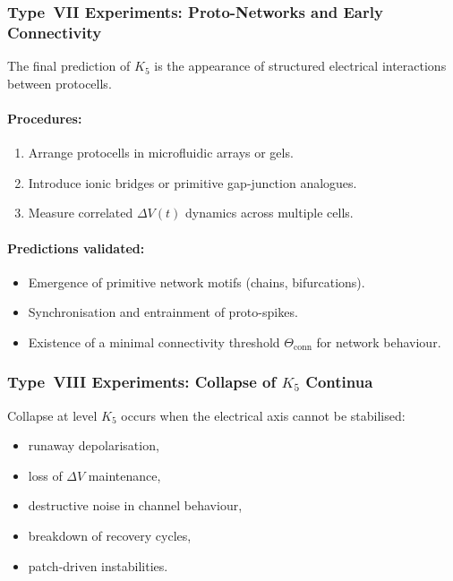 \subsubsection{Type~VII Experiments: Proto-Networks and Early Connectivity}

The final prediction of $K_5$ is the appearance of structured 
electrical interactions between protocells.

\paragraph{Procedures:}

\begin{enumerate}
    \item Arrange protocells in microfluidic arrays or gels.
    \item Introduce ionic bridges or primitive gap-junction analogues.
    \item Measure correlated $\Delta V(t)$ dynamics across multiple cells.
\end{enumerate}

\paragraph{Predictions validated:}

\begin{itemize}
    \item Emergence of primitive network motifs (chains, bifurcations).
    \item Synchronisation and entrainment of proto-spikes.
    \item Existence of a minimal connectivity threshold 
          $\Theta_{\mathrm{conn}}$ for network behaviour.
\end{itemize}



\subsubsection{Type~VIII Experiments: Collapse of \texorpdfstring{$K_5$}{K5} Continua}

Collapse at level $K_5$ occurs when the electrical axis 
cannot be stabilised:

\begin{itemize}
    \item runaway depolarisation,
    \item loss of $\Delta V$ maintenance,
    \item destructive noise in channel behaviour,
    \item breakdown of recovery cycles,
    \item patch-driven instabilities.
\end{itemize}

